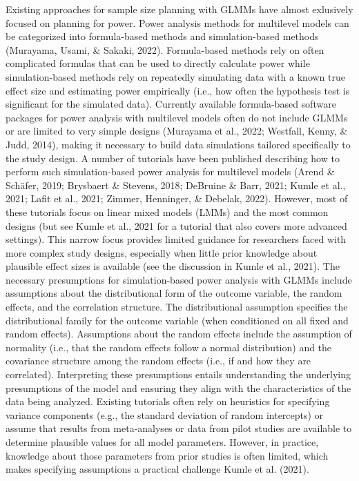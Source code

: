 \documentclass[
  man,floatsintext]{apa6}
\begin{document}
Existing approaches for sample size planning with GLMMs have almost exlusively focused on planning for power.
Power analysis methods for multilevel models can be categorized into formula-based methods and simulation-based methods (Murayama, Usami, \& Sakaki, 2022).
Formula-based methods rely on often complicated formulas that can be used to directly calculate power while simulation-based methods rely on repeatedly simulating data with a known true effect size and estimating power empirically (i.e., how often the hypothesis test is significant for the simulated data).
Currently available formula-based software packages for power analysis with multilevel models often do not include GLMMs or are limited to very simple designs (Murayama et al., 2022; Westfall, Kenny, \& Judd, 2014), making it necessary to build data simulations tailored specifically to the study design.
A number of tutorials have been published describing how to perform such simulation-based power analysis for multilevel models (Arend \& Schäfer, 2019; Brysbaert \& Stevens, 2018; DeBruine \& Barr, 2021; Kumle et al., 2021; Lafit et al., 2021; Zimmer, Henninger, \& Debelak, 2022).
However, most of these tutorials focus on linear mixed models (LMMs) and the most common designs (but see Kumle et al., 2021 for a tutorial that also covers more advanced settings). This narrow focus provides limited guidance for researchers faced with more complex study designs, especially when little prior knowledge about plausible effect sizes is available (see the discussion in Kumle et al., 2021).
The necessary presumptions for simulation-based power analysis with GLMMs include assumptions about the distributional form of the outcome variable, the random effects, and the correlation structure. The distributional assumption specifies the distributional family for the outcome variable (when conditioned on all fixed and random effects). Assumptions about the random effects include the assumption of normality (i.e., that the random effects follow a normal distribution) and the covariance structure among the random effects (i.e., if and how they are correlated). Interpreting these presumptions entails understanding the underlying presumptions of the model and ensuring they align with the characteristics of the data being analyzed.
Existing tutorials often rely on heuristics for specifying variance components (e.g., the standard deviation of random intercepts) or assume that results from meta-analyses or data from pilot studies are available to determine plausible values for all model parameters. However, in practice, knowledge about those parameters from prior studies is often limited, which makes specifying assumptions a practical challenge Kumle et al. (2021).
\end{document}

